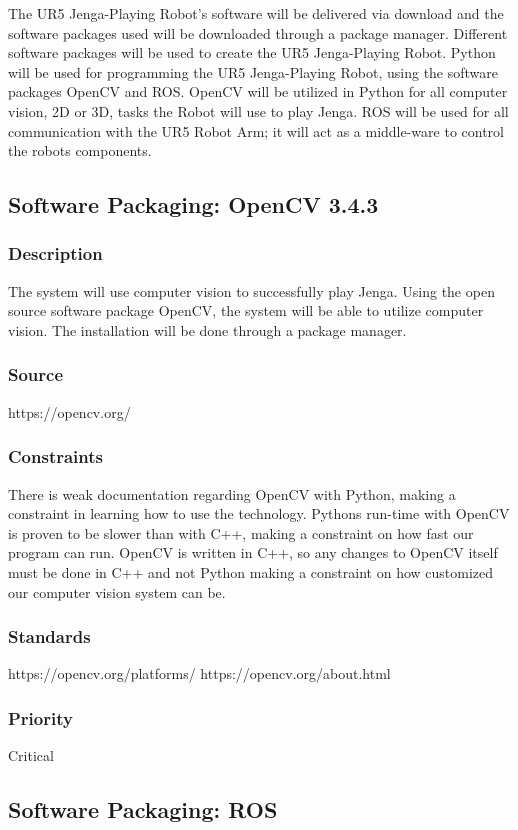 The UR5 Jenga-Playing Robot's software will be delivered via download and the software packages used will be downloaded through a package manager. Different software packages will be used to create the UR5 Jenga-Playing Robot. Python will be used for programming the UR5 Jenga-Playing Robot, using the software packages OpenCV and ROS. OpenCV will be utilized in Python for all computer vision, 2D or 3D, tasks the Robot will use to play Jenga. ROS will be used for all communication with the UR5 Robot Arm; it will act as a middle-ware to control the robots components. 

\subsection{Software Packaging: OpenCV 3.4.3}
\subsubsection{Description}
The system will use computer vision to successfully play Jenga. Using the open source software package OpenCV, the system will be able to utilize computer vision. The installation will be done through a package manager. 
\subsubsection{Source}
https://opencv.org/
\subsubsection{Constraints}
There is weak documentation regarding OpenCV with Python, making a constraint in learning how to use the technology. Pythons run-time with OpenCV is proven to be slower than with C++, making a constraint on how fast our program can run. OpenCV is written in C++, so any changes to OpenCV itself must be done in C++ and not Python making a constraint on how customized our computer vision system can be. 
\subsubsection{Standards}
https://opencv.org/platforms/
https://opencv.org/about.html
\subsubsection{Priority}
Critical

\subsection{Software Packaging: ROS}
